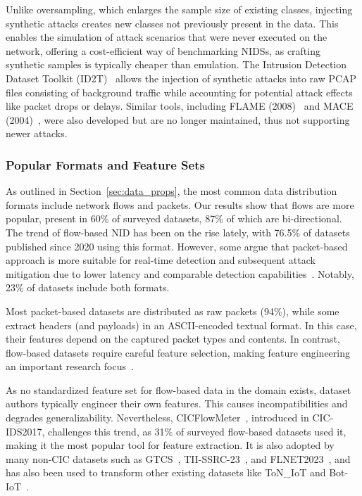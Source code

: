 Unlike oversampling, which enlarges the sample size of existing classes, injecting synthetic attacks creates new classes not previously present in the data. This enables the simulation of attack scenarios that were never executed on the network, offering a cost-efficient way of benchmarking NIDSs, as crafting synthetic samples is typically cheaper than emulation. The Intrusion Detection Dataset Toolkit (ID2T)~\cite{cordero2021_id2t,vasilomanolakis2016_id2t} allows the injection of synthetic attacks into raw PCAP files consisting of background traffic while accounting for potential attack effects like packet drops or delays. Similar tools, including FLAME (2008)~\cite{brauckhoff2008_flame} and MACE (2004)~\cite{sommers2004_mace}, were also developed but are no longer maintained, thus not supporting newer attacks.

\subsubsection{Popular Formats and Feature Sets}
\label{sssec:ndatasurv_trends_formats_features}

As outlined in Section~\ref{sec:data_props}, the most common data distribution formats include network flows and packets. Our results show that flows are more popular, present in 60\% of surveyed datasets, 87\% of which are bi-directional. The trend of flow-based NID has been on the rise lately, with 76.5\% of datasets published since 2020 using this format. However, some argue that packet-based approach is more suitable for real-time detection and subsequent attack mitigation due to lower latency and comparable detection capabilities~\cite{goldschmidt2024_windower}. Notably, 23\% of datasets include both formats.

Most packet-based datasets are distributed as raw packets (94\%), while some extract headers (and payloads) in an ASCII-encoded textual format. In this case, their features depend on the captured packet types and contents. In contrast, flow-based datasets require careful feature selection, making feature engineering an important research focus~\cite{sarhan2022_evaluting_ftr_sets_nids,ngo2024_mlbased_features_sel_extr}.

As no standardized feature set for flow-based data in the domain exists, dataset authors typically engineer their own features. This causes incompatibilities and degrades generalizability. Nevertheless, CICFlowMeter~\cite{lashkari2016_cicflowmeter}, introduced in CIC-IDS2017, challenges this trend, as 31\% of surveyed flow-based datasets used it, making it the most popular tool for feature extraction. It is also adopted by many non-CIC datasets such as GTCS~\cite{mahfouz2020_gtcs}, TII-SSRC-23~\cite{heryalla2023_tii_src23}, and FLNET2023~\cite{kumar2023_flnet2023}, and has also been used to transform other existing datasets like ToN\_IoT and Bot-IoT~\cite{sarhan2022_nids_feature_set}.

